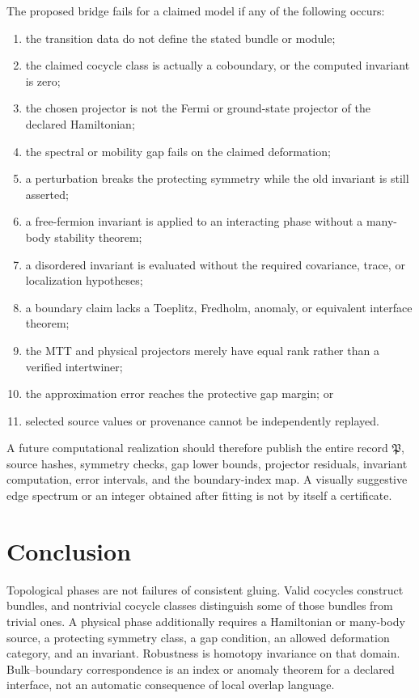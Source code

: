 \documentclass[11pt]{article}
\theoremstyle{definition}
\theoremstyle{remark}
\begin{document}
The proposed bridge fails for a claimed model if any of the following
occurs:
\begin{enumerate}[label=(F\arabic*)]
\item the transition data do not define the stated bundle or module;
\item the claimed cocycle class is actually a coboundary, or the computed
  invariant is zero;
\item the chosen projector is not the Fermi or ground-state projector of the
  declared Hamiltonian;
\item the spectral or mobility gap fails on the claimed deformation;
\item a perturbation breaks the protecting symmetry while the old invariant
  is still asserted;
\item a free-fermion invariant is applied to an interacting phase without a
  many-body stability theorem;
\item a disordered invariant is evaluated without the required covariance,
  trace, or localization hypotheses;
\item a boundary claim lacks a Toeplitz, Fredholm, anomaly, or equivalent
  interface theorem;
\item the MTT and physical projectors merely have equal rank rather than a
  verified intertwiner;
\item the approximation error reaches the protective gap margin; or
\item selected source values or provenance cannot be independently replayed.
\end{enumerate}

A future computational realization should therefore publish the entire
record \(\mathfrak P\), source hashes, symmetry checks, gap lower bounds,
projector residuals, invariant computation, error intervals, and the
boundary-index map.  A visually suggestive edge spectrum or an integer
obtained after fitting is not by itself a certificate.

\section{Conclusion}

Topological phases are not failures of consistent gluing.  Valid cocycles
construct bundles, and nontrivial cocycle classes distinguish some of those
bundles from trivial ones.  A physical phase additionally requires a
Hamiltonian or many-body source, a protecting symmetry class, a gap
condition, an allowed deformation category, and an invariant.  Robustness is
homotopy invariance on that domain.  Bulk--boundary correspondence is an
index or anomaly theorem for a declared interface, not an automatic
consequence of local overlap language.
\end{document}
